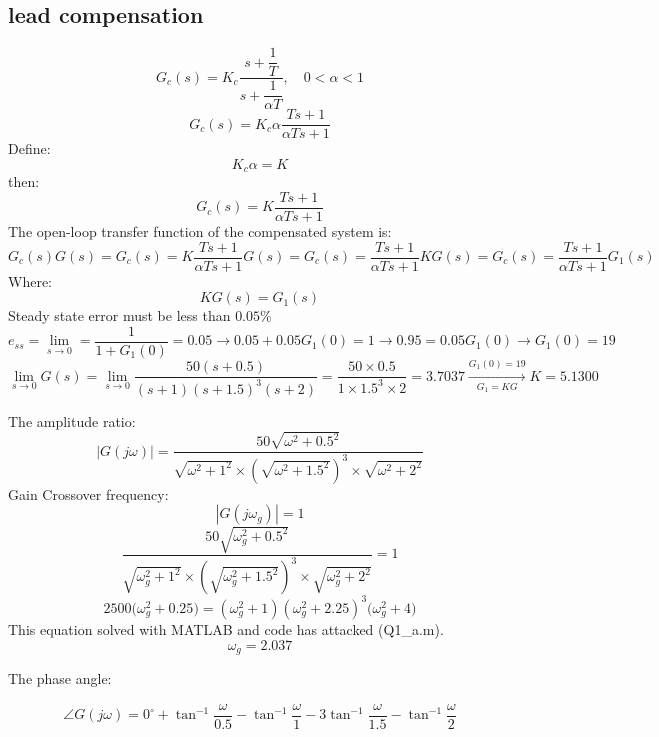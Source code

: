 \subsection{lead compensation}
$$
G_c(s) = K_c\dfrac{s + \dfrac{1}{T}}{s+\dfrac{1}{\alpha T}}, \quad 0 < \alpha < 1
$$
$$
G_c(s) = K_c \alpha \dfrac{Ts + 1}{\alpha T s + 1}
$$
Define:
$$K_c\alpha = K$$
then:
$$
G_c(s) = K \dfrac{Ts + 1}{\alpha T s + 1}
$$
The open-loop transfer function of the compensated system is:
$$
G_c(s)G(s) = G_c(s) = K \dfrac{Ts + 1}{\alpha T s + 1} G(s)
= G_c(s) = \dfrac{Ts + 1}{\alpha T s + 1}KG(s) = G_c(s) = \dfrac{Ts + 1}{\alpha T s + 1}G_1(s)
$$
Where:
$$
KG(s)= G_1(s)
$$
Steady state error must be less than $0.05\%$
$$
e_{ss} = \lim_{s\to 0} = \dfrac{1}{1+G_1(0)} = 0.05 \to 0.05 + 0.05G_1(0) = 1 \to 0.95 = 0.05G_1(0) \to G_1(0) = 19
$$
$$
\lim_{s\to 0} G(s) = \lim_{s\to 0} \dfrac{50(s+0.5)}{(s+1)(s+1.5)^{3}(s+2)} = \dfrac{50\times0.5}{1\times1.5^3\times2} = 3.7037 \xrightarrow[G_1 = KG]{G_1(0) = 19} K = 5.1300
$$




The amplitude ratio:
$$
\left\vert G(j\omega) \right\vert = \dfrac{50\sqrt{\omega^2+0.5^2}}{\sqrt{\omega^2+1^2}\times(\sqrt{\omega^2 + 1.5^2})^3\times\sqrt{\omega^2 + 2^2}}
$$
Gain Crossover frequency:
$$
\left\vert G(j\omega_g) \right\vert = 1
$$
\newline
$$
\dfrac{50\sqrt{\omega_g^2+0.5^2}}{\sqrt{\omega_g^2+1^2}\times(\sqrt{\omega_g^2 + 1.5^2})^3\times\sqrt{\omega_g^2 + 2^2}} = 1
$$
$$
{2500({\omega_g^2+0.25}}) = 
{({\omega_g^2+1})({\omega_g^2 + 2.25})^3({\omega_g^2 + 4}})
$$
This equation solved with MATLAB and code has attacked (Q1\_a.m).
$$
\omega_g = 2.037
$$

The phase angle:

$$
\angle G(j\omega) = 0^{\circ} + \tan^{-1}\dfrac{\omega}{0.5} - \tan^{-1}\dfrac{\omega}{1} - 3\tan^{-1}\dfrac{\omega}{1.5} - \tan^{-1}\dfrac{\omega}{2}
$$

